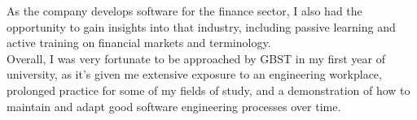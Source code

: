 As the company develops software for the finance sector, I also had the opportunity to gain insights into that industry, including passive learning and active training on financial markets and terminology.
\\

Overall, I was very fortunate to be approached by GBST in my first year of university, as it's given me extensive exposure to an engineering workplace, prolonged practice for some of my fields of study, and a demonstration of how to maintain and adapt good software engineering processes over time.

\begin{comment}
lorem ipsum blah blah blah
\end{comment}
